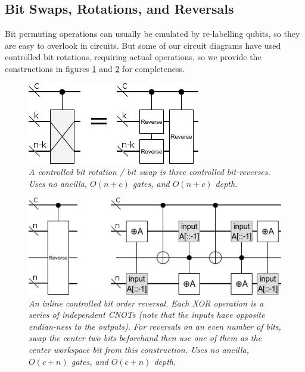\documentclass[twocolumn]{article}
\begin{document}
\subsection{Bit Swaps, Rotations, and Reversals}

Bit permuting operations can usually be emulated by re-labelling qubits, so they are easy to overlook in circuits.
But some of our circuit diagrams have used controlled bit rotations, requiring actual operations, so we provide the constructions in figures \ref{fig:bit-rotate} and \ref{fig:bit-reverse} for completeness.

\begin{figure}
  \centering
  \includegraphics[width=\linewidth]{assets/controlled-bit-rotate.png}
  \caption{\em
    A controlled bit rotation / bit swap is three controlled bit-reverses.
    Uses no ancilla, $O(n+c)$ gates, and $O(n+c)$ depth.
  }
  \label{fig:bit-rotate}
\end{figure}

\begin{figure}
  \centering
  \includegraphics[width=\linewidth]{assets/controlled-reverse.png}
  \caption{\em
    An inline controlled bit order reversal.
    Each XOR operation is a series of independent CNOTs (note that the inputs have opposite endian-ness to the outputs).
    For reversals on an even number of bits, swap the center two bits beforehand then use one of them as the center workspace bit from this construction.
    Uses no ancilla, $O(c + n)$ gates, and $O(c + n)$ depth.
  }
  \label{fig:bit-reverse}
\end{figure}
\end{document}
